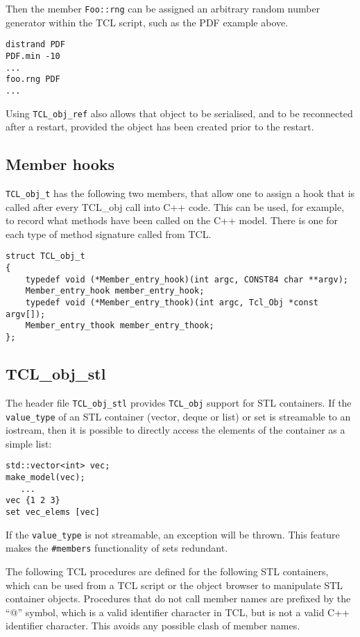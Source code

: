 Then the member \verb+Foo::rng+ can be assigned an arbitrary random number
generator within the TCL script, such as the PDF example above.

\begin{verbatim}
distrand PDF
PDF.min -10
...
foo.rng PDF
...
\end{verbatim}

Using \verb+TCL_obj_ref+ also allows that object to be serialised, and
to be reconnected after a restart, provided the object has been
created prior to the restart.

\subsection{Member hooks}\label{Member hooks}

\verb+TCL_obj_t+ has the following two members, that allow one to
assign a hook that is called after every TCL\_obj call into C++
code. This can be used, for example, to record what methods have been
called on the C++ model. There is one for each type of method
signature called from TCL.

\begin{verbatim}
struct TCL_obj_t
{
    typedef void (*Member_entry_hook)(int argc, CONST84 char **argv);
    Member_entry_hook member_entry_hook;
    typedef void (*Member_entry_thook)(int argc, Tcl_Obj *const argv[]);
    Member_entry_thook member_entry_thook;
};
\end{verbatim}

\subsection{TCL\_obj\_stl}\label{TCL_obj_stl}

The header file \verb+TCL_obj_stl+ provides \verb+TCL_obj+ support for
STL containers. If the \verb+value_type+ of an STL container (vector, deque
or list) or set is streamable to an iostream, then it is possible to
directly access the elements of the container as a simple list:

\begin{verbatim}
std::vector<int> vec;
make_model(vec);
   ...
vec {1 2 3}
set vec_elems [vec]
\end{verbatim}
If the \verb+value_type+ is not streamable, an exception will be thrown. This
feature makes the \verb+#members+ functionality of sets redundant.

The following TCL procedures are defined for the
following STL containers, which can be used from a TCL script or the
object browser to manipulate STL container objects. Procedures that do
not call member names are prefixed by the ``@'' symbol, which is a
valid identifier character in TCL, but is not a valid C++ identifier
character. This avoids any possible clash of member names.

